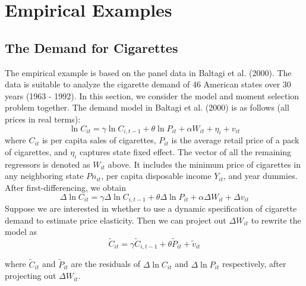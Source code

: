 \section{Empirical Examples}
\label{sec:empirical}

\subsection{The Demand for Cigarettes}
\label{sec:cigarettes}

The empirical example is based on the panel data in Baltagi et al. (2000). The data is suitable to analyze the cigarette demand of 46 American states over 30 years (1963 - 1992). In this section, we consider the model and moment selection problem together. The demand model in Baltagi et al. (2000) is as follows (all prices in real terms): 
\[
\ln C_{it} =  \gamma \ln C_{i,t-1} + \theta \ln P_{it} + \alpha W_{it} + \eta_i +  v_{it}
\] 
where $C_{it}$ is per capita sales of cigarettes, $P_{it}$ is the average retail price of a pack of cigarettes, and $\eta_i$ captures state fixed effect. The vector of all the remaining regressors is denoted as $W_{it}$ above. It includes the minimum price of cigarettes in any neighboring state $Pn_{it}$, per capita disposable income $Y_{it}$, and year dummies. After first-differencing, we obtain 
\[
\Delta \ln C_{it} = \gamma \Delta \ln C_{i,t-1} +  \theta \Delta \ln P_{it} +\alpha \Delta W_{it} +  \Delta v_{it}
\]
 Suppose we are interested in whether to use a dynamic specification of cigarette demand to estimate price elasticity. Then we can project out $\Delta W_{it}$ to rewrite the model as
\[
\widetilde{C}_{it} = \gamma \widetilde{C}_{i,t-1} + \theta \widetilde{P}_{it} + \widetilde{v}_{it} 
\] 
 
 where $\widetilde{C}_{it}$ and $\widetilde{P}_{it}$ are the residuals of $\Delta \ln C_{it}$ and $\Delta \ln P_{it}$ respectively, after projecting out $\Delta W_{it}$.
 
